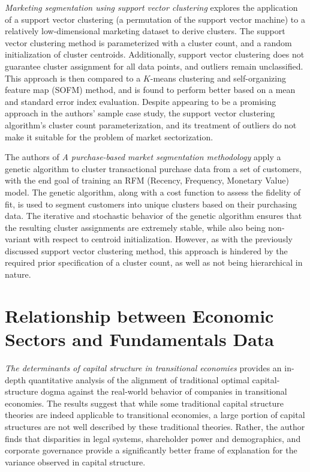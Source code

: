 \documentclass[../main.tex]{subfiles}
\begin{document}
\textit{Marketing segmentation using support vector clustering} explores the application of a support vector clustering (a permutation of the support vector machine) to a relatively low-dimensional marketing dataset to derive clusters. The support vector clustering method is parameterized with a cluster count, and a random initialization of cluster centroids. Additionally, support vector clustering does not guarantee cluster assignment for all data points, and outliers remain unclassified. This approach is then compared to a $K$-means clustering and self-organizing feature map (SOFM) method, and is found to perform better based on a mean and standard error index evaluation. Despite appearing to be a promising approach in the authors' sample case study, the support vector clustering algorithm's cluster count parameterization, and its treatment of outliers do not make it suitable for the problem of market sectorization.

The authors of \textit{A purchase-based market segmentation methodology} apply a genetic algorithm to cluster transactional purchase data from a set of customers, with the end goal of training an RFM (Recency, Frequency, Monetary Value) model. The genetic algorithm, along with a cost function to assess the fidelity of fit, is used to segment customers into unique clusters based on their purchasing data. The iterative and stochastic behavior of the genetic algorithm ensures that the resulting cluster assignments are extremely stable, while also being non-variant with respect to centroid initialization. However, as with the previously discussed support vector clustering method, this approach is hindered by the required prior specification of a cluster count, as well as not being hierarchical in nature.

\pagebreak

\section{Relationship between Economic Sectors and Fundamentals Data} \label{literature_review:economic_sectors_fundamentals}

\textit{The determinants of capital structure in transitional economies} provides an in-depth quantitative analysis of the alignment of traditional optimal capital-structure dogma against the real-world behavior of companies in transitional economies. The results suggest that while some traditional capital structure theories are indeed applicable to transitional economies, a large portion of capital structures are not well described by these traditional theories. Rather, the author finds that disparities in legal systems, shareholder power and demographics, and corporate governance provide a significantly better frame of explanation for the variance observed in capital structure.
\end{document}
